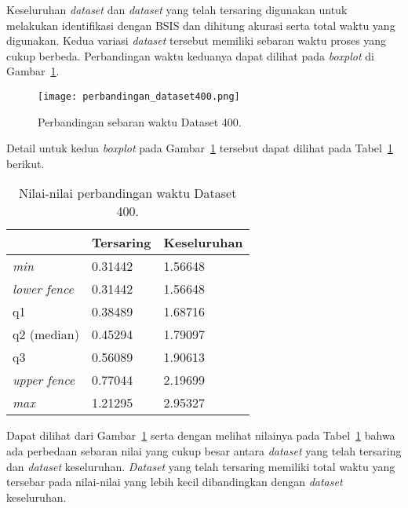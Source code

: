 Keseluruhan \textit{dataset} dan \textit{dataset} yang telah tersaring digunakan untuk melakukan identifikasi dengan BSIS dan dihitung akurasi serta total waktu yang digunakan. Kedua variasi \textit{dataset} tersebut memiliki sebaran waktu proses yang cukup berbeda. Perbandingan waktu keduanya dapat dilihat pada \textit{boxplot} di Gambar~\ref{fig:perbandingan_dataset400}.

\begin{figure}[H]
	\centering
	\texttt{[image: perbandingan\_dataset400.png]}
	\caption{Perbandingan sebaran waktu Dataset 400.}
	\label{fig:perbandingan_dataset400}
\end{figure}

Detail untuk kedua \textit{boxplot} pada Gambar~\ref{fig:perbandingan_dataset400} tersebut dapat dilihat pada Tabel~\ref{tab:perbandingan_dataset400} berikut.
\begin{table}[H]
	\centering
	\begin{tabular}{|l|l|l|}
		\hline
		& \textbf{Tersaring} & \textbf{Keseluruhan} \\ \hline
		\textit{min}         & 0.31442            & 1.56648              \\ \hline
		\textit{lower fence} & 0.31442            & 1.56648              \\ \hline
		q1                   & 0.38489            & 1.68716              \\ \hline
		q2 (median)          & 0.45294            & 1.79097              \\ \hline
		q3                   & 0.56089            & 1.90613              \\ \hline
		\textit{upper fence} & 0.77044            & 2.19699              \\ \hline
		\textit{max}         & 1.21295            & 2.95327              \\ \hline
	\end{tabular}
	\caption{Nilai-nilai perbandingan waktu Dataset 400.}
	\label{tab:perbandingan_dataset400}
\end{table}

Dapat dilihat dari Gambar~\ref{fig:perbandingan_dataset400} serta dengan melihat nilainya pada Tabel~\ref{tab:perbandingan_dataset400} bahwa ada perbedaan sebaran nilai yang cukup besar antara \textit{dataset} yang telah tersaring dan \textit{dataset} keseluruhan. \textit{Dataset} yang telah tersaring memiliki total waktu yang tersebar pada nilai-nilai yang lebih kecil dibandingkan dengan \textit{dataset} keseluruhan. 

